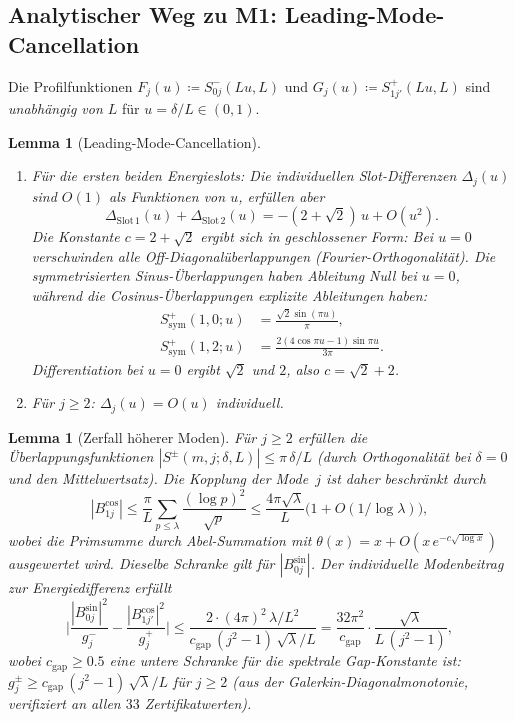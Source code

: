 \documentclass[12pt,a4paper]{article}
\newtheorem{lemma}[theorem]{Lemma}
\theoremstyle{definition}
\theoremstyle{remark}
\begin{document}
\subsection{Analytischer Weg zu M1: Leading-Mode-Cancellation}
\label{sec:leading-mode}

Die Profilfunktionen $F_j(u) \coloneqq S^-_{0j}(Lu, L)$ und $G_j(u) \coloneqq S^+_{1j'}(Lu, L)$ sind \emph{unabhängig von $L$} für $u = \delta/L \in (0,1)$.

\begin{lemma}[Leading-Mode-Cancellation]
\label{lem:leading-cancel}
\begin{enumerate}[label=\textup{(\alph*)}]
  \item Für die ersten beiden Energieslots: Die individuellen Slot-Differenzen $\Delta_j(u)$ sind $O(1)$ als Funktionen von $u$, erfüllen aber
  \begin{equation}
  \label{eq:pairwise-cancel}
    \Delta_{\mathrm{Slot\,1}}(u) + \Delta_{\mathrm{Slot\,2}}(u) = -(2 + \sqrt{2})\,u + O(u^2).
  \end{equation}
  Die Konstante $c = 2 + \sqrt{2}$ ergibt sich in geschlossener Form: Bei $u = 0$ verschwinden alle Off-Diagonalüberlappungen (Fourier-Orthogonalität). Die symmetrisierten Sinus-Überlappungen haben \emph{Ableitung Null} bei $u = 0$, während die Cosinus-Überlappungen explizite Ableitungen haben:
  \begin{align}
    S^+_{\mathrm{sym}}(1,0;u) &= \frac{\sqrt{2}\sin(\pi u)}{\pi}, \label{eq:Scos10} \\
    S^+_{\mathrm{sym}}(1,2;u) &= \frac{2(4\cos\pi u - 1)\sin\pi u}{3\pi}. \label{eq:Scos12}
  \end{align}
  Differentiation bei $u = 0$ ergibt $\sqrt{2}$ und $2$, also $c = \sqrt{2} + 2$.
  \item Für $j \geq 2$: $\Delta_j(u) = O(u)$ individuell.
\end{enumerate}
\end{lemma}

\begin{lemma}[Zerfall höherer Moden]
\label{lem:higher-mode-decay}
Für $j \geq 2$ erfüllen die Überlappungsfunktionen $|S^{\pm}(m,j;\delta,L)| \leq \pi\,\delta/L$ (durch Orthogonalität bei $\delta = 0$ und den Mittelwertsatz). Die Kopplung der Mode~$j$ ist daher beschränkt durch
\[
  |B_{1j}^{\cos}| \leq \frac{\pi}{L}\sum_{p \leq \lambda}\frac{(\log p)^2}{\sqrt{p}}
  \leq \frac{4\pi\sqrt{\lambda}}{L}\bigl(1 + O(1/\log\lambda)\bigr),
\]
wobei die Primsumme durch Abel-Summation mit $\theta(x) = x + O(x\,e^{-c\sqrt{\log x}})$ ausgewertet wird. Dieselbe Schranke gilt für $|B_{0j}^{\sin}|$. Der individuelle Modenbeitrag zur Energiedifferenz erfüllt
\[
  \biggl|\frac{|B_{0j}^{\sin}|^2}{g_j^-} - \frac{|B_{1j'}^{\cos}|^2}{g_j^+}\biggr|
  \leq \frac{2 \cdot (4\pi)^2 \,\lambda/L^2}{c_{\mathrm{gap}}\,(j^2-1)\,\sqrt{\lambda}/L}
  = \frac{32\pi^2}{c_{\mathrm{gap}}}\cdot\frac{\sqrt{\lambda}}{L\,(j^2-1)},
\]
wobei $c_{\mathrm{gap}} \geq 0.5$ eine untere Schranke für die spektrale Gap-Konstante ist: $g_j^{\pm} \geq c_{\mathrm{gap}}\,(j^2-1)\,\sqrt{\lambda}/L$ für $j \geq 2$ (aus der Galerkin-Diagonalmonotonie, verifiziert an allen $33$ Zertifikatwerten).
\end{lemma}
\end{document}
